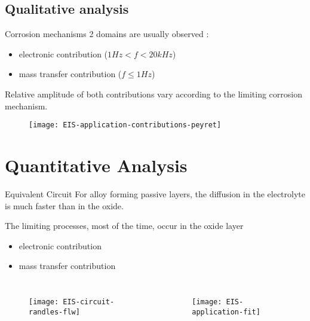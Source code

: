 \documentclass[10pt,compress,handout]{beamer}
\begin{document}
    \subsection{Qualitative analysis}
    \begin{frame}{Corrosion mechanisms}
        2 domains are usually observed \citep{peyret2023}:
        \begin{itemize}
            \item  electronic contribution ($1Hz < f < 20 kHz$)
            \item  mass transfer contribution ($f \le 1Hz$)
        \end{itemize}
        Relative amplitude of both contributions vary according to the limiting corrosion mechanism.

        \begin{figure}
            \centering
            \texttt{[image: EIS-application-contributions-peyret]}
        \end{figure}
        
    \end{frame}

    \section{Quantitative Analysis} 
    \begin{frame}{Equivalent Circuit}
        For alloy forming passive layers, the diffusion in the electrolyte 
        is much faster than in the oxide.
        
        The limiting processes, most of the time, occur in the oxide layer
        \begin{itemize}
            \item  electronic contribution
            \item  mass transfer contribution
        \end{itemize}
        
        \begin{columns}
                \begin{figure}
                    \centering
                    \texttt{[image: EIS-circuit-randles-flw]}
                \end{figure}
                \begin{figure}
                    \centering
                    \texttt{[image: EIS-application-fit]}
                \end{figure}
        \end{columns}
    \end{frame}
\end{document}
